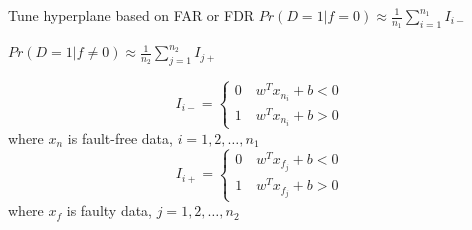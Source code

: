 \documentclass[10pt]{beamer}
\begin{document}
\begin{frame}{Tune hyperplane based on FAR or FDR}
$Pr(D=1|f=0) \approx \frac{1}{n_1}\sum_{i=1}^{n_1}I_{i-}$  \par
$Pr(D=1|f \neq 0) \approx          \frac{1}{n_2}\sum_{j=1}^{n_2}I_{j+}$ \par
\begin{equation}
I_{i-} = \left\{ \begin{aligned}
0 \quad  w^Tx_{n_i} + b < 0 \\
1 \quad w^Tx_{n_i} +b  > 0 
\end{aligned}
\right.
\end{equation}
where $x_n$ is fault-free data, $i=1,2,\dots,n_1$
\begin{equation}
I_{i+} = \left\{ \begin{aligned}
0 \quad  w^Tx_{f_j} + b < 0 \\
1 \quad w^Tx_{f_j} +b  > 0 
\end{aligned}
\right.
\end{equation}
where $x_f$ is faulty data, $j=1,2,\dots,n_2$
\end{frame}
\end{document}
